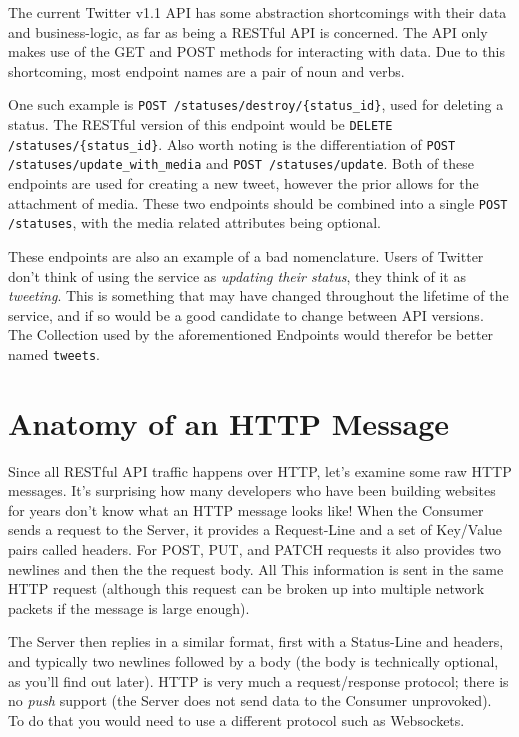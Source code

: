 \documentclass{book}
\begin{document}
The current Twitter v1.1 API \cite{TWITTERAPI} has some abstraction shortcomings with their data and business-logic, as far as being a RESTful API is concerned. The API only makes use of the GET and POST methods for interacting with data. Due to this shortcoming, most endpoint names are a pair of noun and verbs.

One such example is \texttt{POST /statuses/destroy/\{status\_id\}}, used for deleting a status. The RESTful version of this endpoint would be \texttt{DELETE /statuses/\{status\_id\}}. Also worth noting is the differentiation of \texttt{POST /statuses/update\_with\_media} and \texttt{POST /statuses/update}. Both of these endpoints are used for creating a new tweet, however the prior allows for the attachment of media. These two endpoints should be combined into a single \texttt{POST /statuses}, with the media related attributes being optional.

These endpoints are also an example of a bad nomenclature. Users of Twitter don't think of using the service as \emph{updating their status}, they think of it as \emph{tweeting}. This is something that may have changed throughout the lifetime of the service, and if so would be a good candidate to change between API versions. The Collection used by the aforementioned Endpoints would therefor be better named \texttt{tweets}.


\section{Anatomy of an HTTP Message}

Since all RESTful API traffic happens over HTTP, let's examine some raw HTTP messages. It's surprising how many developers who have been building websites for years don't know what an HTTP message looks like! When the Consumer sends a request to the Server, it provides a Request-Line and a set of Key/Value pairs called headers. For POST, PUT, and PATCH requests it also provides two newlines and then the the request body. All This information is sent in the same HTTP request (although this request can be broken up into multiple network packets if the message is large enough).

The Server then replies in a similar format, first with a Status-Line and headers, and typically two newlines followed by a body (the body is technically optional, as you'll find out later). HTTP is very much a request/response protocol; there is no \emph{push} support (the Server does not send data to the Consumer unprovoked). To do that you would need to use a different protocol such as Websockets.
\end{document}
